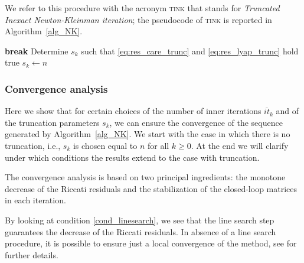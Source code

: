 \documentclass[a4paper,10pt]{article}
\newcommand{\norm}[1]{\left\lVert#1\right\rVert}
\begin{document}
We refer to this procedure with the acronym \textsc{tink} that stands for \emph{Truncated Inexact Newton-Kleinman iteration}; the pseudocode of \textsc{tink} is reported in Algorithm~\ref{alg_NK}.

\begin{algorithm}[h]
	\caption{Truncated inexact Newton-Kleinman iteration for Riccati equations}
	\begin{algorithmic}[1]
		\If{$\norm{ \mathcal{R}(\widetilde X_{k}) }_2 < \mathsf{tol}$}
		\State \textbf{break}
		\EndIf
		\Else
		\EndIf
		\State Determine $s_k$ such that \eqref{eq:res_care_trunc} and \eqref{eq:res_lyap_trunc} hold true
		\Else
		\State $s_k\gets n$
		\EndIf
		\EndFor
		\State {}
		\EndProcedure
	\end{algorithmic}
	\label{alg_NK}
\end{algorithm}

\subsubsection{Convergence analysis}

Here we show that for certain choices of the number of inner iterations $\overline{it}_k$ and of the truncation parameters $s_k$, we can ensure  the convergence of the sequence generated by Algorithm~\ref{alg_NK}. We start with the case in which there is no truncation, i.e., $s_k$ is chosen equal to $n$ for all $k\ge 0$. At the end we will clarify under which conditions the results extend to the case with truncation.  

The convergence analysis is based on two principal ingredients: the monotone decrease of the Riccati residuals and the stabilization of the closed-loop matrices in each iteration.

By looking at condition \eqref{cond_linesearch}, we see that the line search step guarantees the decrease of the Riccati residuals.
In absence of a line search procedure, it is possible to ensure just a local convergence of the method, see \cite{feitzinger2009inexact} for further details.
\end{document}
